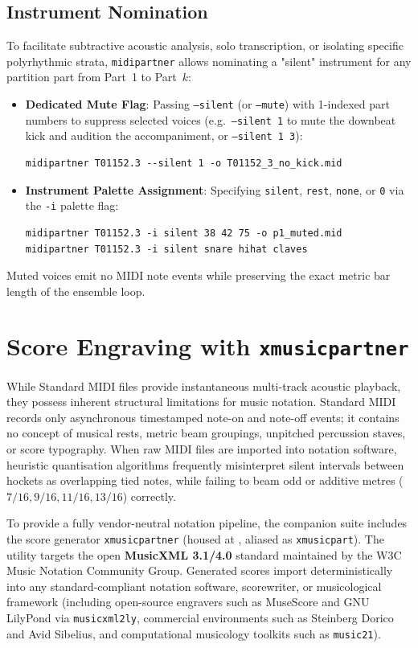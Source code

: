 \subsection{Instrument Nomination}
To facilitate subtractive acoustic analysis, solo transcription, or isolating specific polyrhythmic strata, \texttt{midipartner} allows nominating a "silent" instrument for any partition part from Part~1 to Part~$k$:
\begin{itemize}
    \item \textbf{Dedicated Mute Flag}: Passing \texttt{--silent} (or \texttt{--mute}) with 1-indexed part numbers to suppress selected voices (e.g.\ \texttt{--silent 1} to mute the downbeat kick and audition the accompaniment, or \texttt{--silent 1 3}):
{\small
\begin{verbatim}
midipartner T01152.3 --silent 1 -o T01152_3_no_kick.mid
\end{verbatim}}
    \item \textbf{Instrument Palette Assignment}: Specifying \texttt{silent}, \texttt{rest}, \texttt{none}, or \texttt{0} via the \texttt{-i} palette flag:
{\small
\begin{verbatim}
midipartner T01152.3 -i silent 38 42 75 -o p1_muted.mid
midipartner T01152.3 -i silent snare hihat claves
\end{verbatim}}
\end{itemize}
Muted voices emit no MIDI note events while preserving the exact metric bar length of the ensemble loop.

\section{Score Engraving with \texttt{xmusicpartner}}
\label{sec:percussion-musicxml}

While Standard MIDI files provide instantaneous multi-track acoustic playback, they possess inherent structural limitations for music notation. Standard MIDI records only asynchronous timestamped note-on and note-off events; it contains no concept of musical rests, metric beam groupings, unpitched percussion staves, or score typography. When raw MIDI files are imported into notation software, heuristic quantisation algorithms frequently misinterpret silent intervals between hockets as overlapping tied notes, while failing to beam odd or additive metres ($7/16, 9/16, 11/16, 13/16$) correctly.

To provide a fully vendor-neutral notation pipeline, the companion suite includes the score generator \texttt{xmusicpartner} (housed at , aliased as \texttt{xmusicpart}). The utility targets the open \textbf{MusicXML 3.1/4.0} standard maintained by the W3C Music Notation Community Group. Generated scores import deterministically into any standard-compliant notation software, scorewriter, or musicological framework (including open-source engravers such as MuseScore and GNU LilyPond via \texttt{musicxml2ly}, commercial environments such as Steinberg Dorico and Avid Sibelius, and computational musicology toolkits such as \texttt{music21}).

